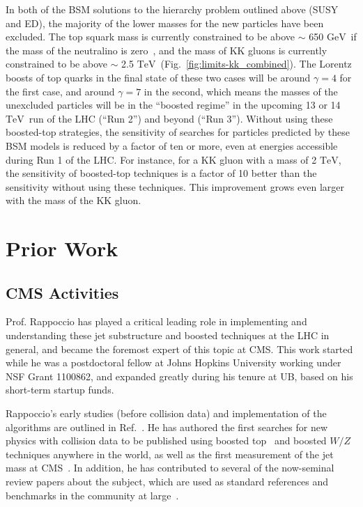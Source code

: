 \documentclass[12pt]{proposalnsf}
\newcommand{\TeV}{\ensuremath{\mathrm{TeV}}}
\newcommand{\GeVcc}{\ensuremath{\mathrm{GeV}}}
\newcommand{\TeVcc}{\ensuremath{\mathrm{TeV}}}
\begin{document}
In both of the BSM solutions to the hierarchy problem outlined above
(SUSY and ED), the majority of the
lower masses for the new particles have been excluded. The top squark
mass is currently
constrained to be above $\sim$ 650 \GeVcc\ if the mass of the
neutralino is zero~\cite{SUS-13-011}, and the mass of
KK gluons is currently constrained to be
above $\sim$ 2.5 \TeVcc\ (Fig.~\ref{fig:limits-kk_combined}).
The Lorentz boosts of top quarks in the final state of these two cases
will be around $\gamma=4$ for the first case, and around $\gamma=7$ in
the second, which means the masses of the unexcluded particles will be
in the ``boosted regime'' in the upcoming 13 or 14 \TeV\ run of the
LHC (``Run 2'') and beyond (``Run 3''). Without using these
boosted-top strategies, the
sensitivity of searches for particles predicted by these BSM models is
reduced by a factor of ten or more, even at energies accessible during
Run 1 of the LHC. For instance, for a KK gluon with a mass of 2
\TeVcc, the sensitivity of boosted-top techniques is a factor of 10
better than the sensitivity without using these techniques. This
improvement grows even larger with the mass of the KK gluon. 



\section{Prior Work}

\subsection{CMS Activities}
\label{sec:priorcms}

Prof. Rappoccio has played a critical leading role in implementing and
understanding these jet substructure and boosted techniques at the LHC
in general, and became the foremost expert of this topic at CMS. This
work started while he was
a postdoctoral fellow at Johns Hopkins University working under NSF
Grant 1100862, and expanded greatly during his tenure at UB, based on
his short-term startup funds. 

Rappoccio's early studies (before collision data) and
implementation of the algorithms are outlined in
Ref.~\cite{catop_cms}. He has authored the first searches
for new physics with collision data to be published using boosted
top~\cite{EXO-11-006} and boosted $W/Z$~\cite{EXO-11-095} techniques
anywhere in the world, as well as the first measurement of the jet
mass at CMS~\cite{SMP-12-019}. In addition, he has contributed to
several of the now-seminal review papers about the subject, which are
used as standard references and benchmarks in the community at
large~\cite{boost2010,boost2011}. 
\end{document}
